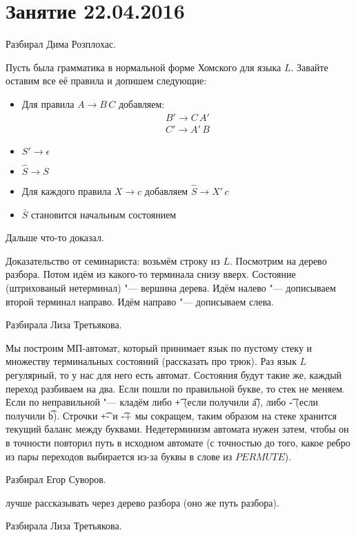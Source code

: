 \chapter{Занятие 22.04.2016}

	Разбирал Дима Розплохас.

	Пусть была грамматика в нормальной форме Хомского для языка $L$.
	Завайте оставим все её правила и допишем следующие:
	\begin{itemize}
		\item
			Для правила $A \to B\,C$ добавляем:
			\begin{gather*}
				B' \to C\, A' \\
				C' \to A'\, B
			\end{gather*}
		\item
			$S' \to \epsilon$
		\item
			$\hat S \to S$
		\item
			Для каждого правила $X \to c$ добавляем $\hat S \to X'\, c$
		\item
			$\bar S$ становится начальным состоянием
	\end{itemize}
	Дальше что-то доказал.

	Доказательство от семинариста: возьмём строку из $L$.
	Посмотрим на дерево разбора.
	Потом идём из какого-то терминала снизу вверх.
	Состояние (штрихованый нетерминал) "--- вершина дерева.
	Идём налево "--- дописываем второй терминал направо.
	Идём направо "--- дописываем слева.

	Разбирала Лиза Третьякова.

	Мы построим МП-автомат, который принимает язык по пустому стеку и множеству терминальных состояний (\TODO рассказать про трюк).
	Раз язык $L$ регулярный, то у нас для него есть автомат.
	Состояния будут такие же, каждый переход разбиваем на два.
	Если пошли по правильной букве, то стек не меняем.
	Если по неправильной "--- кладём либо \t{+} (если получили \t{a}),
	либо \t{-} (если получили \t{b}).
	Строчки \t{+-} и \t{-+} мы сокращем, таким образом на стеке хранится текущий баланс между буквами.
	Недетерминизм автомата нужен затем, чтобы он в точности повторил путь в исходном автомате (с точностью
	до того, какое ребро из пары переходов выбирается из-за буквы в слове из $PERMUTE$).

	Разбирал Егор Суворов.

	\TODO лучше рассказывать через дерево разбора (оно же путь разбора).

	Разбирала Лиза Третьякова.

